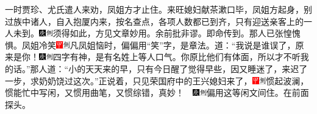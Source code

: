 一时贾珍、尤氏遣人来劝，凤姐方才止住。来旺媳妇献茶漱口毕，凤姐方起身，别过族中诸人，自入抱厦内来，按名查点，各项人数都已到齐，只有迎送亲客上的一人未到。{\includegraphics[width=3mm]{../Images/00004}\includegraphics[width=3mm]{../Images/00011}\footnotesize \kaishu 须得如此，方见文章妙用。余前批非谬。}即命传到。那人已张惶愧惧。凤姐冷笑{\includegraphics[width=3mm]{../Images/00002}\includegraphics[width=3mm]{../Images/00011}\footnotesize \kaishu 凡凤姐恼时，偏偏用“笑”字，是章法。}道：“我说是谁误了，原来是你！{\includegraphics[width=3mm]{../Images/00004}\includegraphics[width=3mm]{../Images/00011}\footnotesize \kaishu 四字有神，是有名姓上等人口气。}你原比他们有体面，所以才不听我的话。”那人道：“小的天天来的早，只有今日醒了觉得早些，因又睡迷了，来迟了一步，求奶奶饶过这次。”正说着，只见荣国府中的王兴媳妇来了，{\includegraphics[width=3mm]{../Images/00002}\includegraphics[width=3mm]{../Images/00011}\footnotesize \kaishu 惯起波澜，惯能忙中写闲，又惯用曲笔，又惯综错，真妙！　\includegraphics[width=3mm]{../Images/00004}\includegraphics[width=3mm]{../Images/00011}\footnotesize \kaishu 偏用这等闲文间住。}在前面探头。

